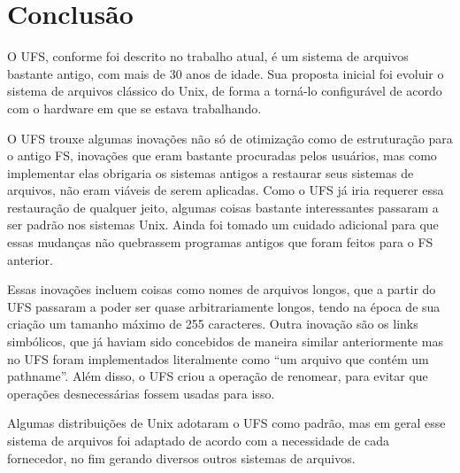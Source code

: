 \section{Conclusão}

O UFS, conforme foi descrito no trabalho atual, é um sistema de arquivos bastante antigo, com mais de 30 anos de idade. Sua proposta inicial foi evoluir o sistema de arquivos clássico do Unix, de forma a torná-lo configurável de acordo com o hardware em que se estava trabalhando.

O UFS trouxe algumas inovações não só de otimização como de estruturação para o antigo FS, inovações que eram bastante procuradas pelos usuários, mas como implementar elas obrigaria os sistemas antigos a restaurar seus sistemas de arquivos, não eram viáveis de serem aplicadas. Como o UFS já iria requerer essa restauração de qualquer jeito, algumas coisas bastante interessantes passaram a ser padrão nos sistemas Unix. Ainda foi tomado um cuidado adicional para que essas mudanças não quebrassem programas antigos que foram feitos para o FS anterior.

Essas inovações incluem coisas como nomes de arquivos longos, que a partir do UFS passaram a poder ser quase arbitrariamente longos, tendo na época de sua criação um tamanho máximo de 255 caracteres. Outra inovação são os links simbólicos, que já haviam sido concebidos de maneira similar anteriormente mas no UFS foram implementados literalmente como ``um arquivo que contém um pathname''. Além disso, o UFS criou a operação de renomear, para evitar que operações desnecessárias fossem usadas para isso.

Algumas distribuições de Unix adotaram o UFS como padrão, mas em geral esse sistema de arquivos foi adaptado de acordo com a necessidade de cada fornecedor, no fim gerando diversos outros sistemas de arquivos.

